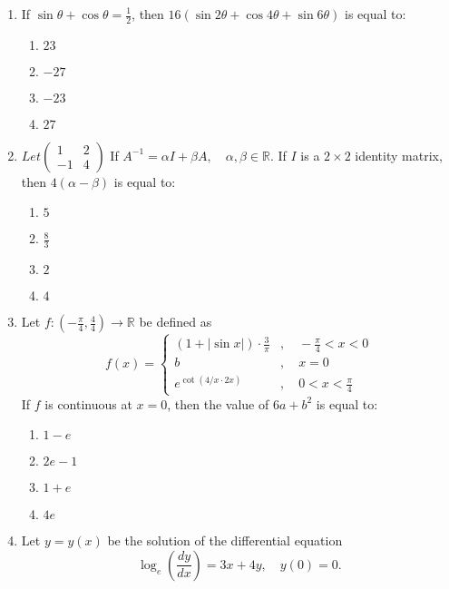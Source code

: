 \documentclass[journal]{IEEEtran}
\numberwithin{equation}{enumi}
\numberwithin{figure}{enumi}
\begin{document}
\begin{enumerate}
\item If $\sin\theta+\cos\theta=\frac{1}{2}$, then $16(\sin2\theta+\cos4\theta+\sin6\theta)$ is equal to:
\begin{enumerate}
    \item $23$
    \item $-27$
    \item $-23$
    \item $27$
\end{enumerate}
  \item $Let \begin{pmatrix}
      1 & 2\\
      -1 & 4
  \end{pmatrix}$
      If $ A^{-1} = \alpha I + \beta A, \quad \alpha, \beta \in \mathbb{R} $. If $ I $ is a $ 2 \times 2 $ identity matrix, then $ 4(\alpha - \beta) $ is equal to:
    \begin{enumerate}
        \item $ 5 $
        \item $ \frac{8}{3} $
        \item $ 2 $
        \item $ 4 $
    \end{enumerate}
\item Let $ f: \left(-\frac{\pi}{4}, \frac{4}{4}\right) \to \mathbb{R} $ be defined as
\begin{equation}
       f(x) =
    \begin{cases}
        (1 + |\sin x|) \cdot \frac{3}{\pi} & , \quad -\frac{\pi}{4} < x < 0 \\
        b & , \quad x = 0 \\
        e^{\cot(4/x \cdot 2x)} & , \quad 0 < x < \frac{\pi}{4}
    \end{cases}
  \end{equation}
    If $ f $ is continuous at $ x = 0 $, then the value of $ 6a + b^2 $ is equal to:
    \begin{enumerate}
        \item $ 1 - e $
        \item $ 2e - 1 $
        \item $ 1 + e $
        \item $ 4e $
    \end{enumerate}
 \item Let $y = y(x)$ be the solution of the differential equation 
    \begin{equation}
    \log_e\left(\frac{dy}{dx}\right) = 3x + 4y, \quad y(0) = 0.
    \end{equation}

\end{enumerate}
\end{document}
